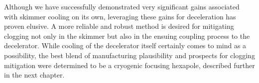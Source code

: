 Although we have successfully demonstrated very significant gains associated with skimmer cooling on its own, leveraging these gains for deceleration has proven elusive.
A more reliable and robust method is desired for mitigating clogging not only in the skimmer but also in the ensuing coupling process to the decelerator.
While cooling of the decelerator itself certainly comes to mind as a possibility, the best blend of manufacturing plausibility and prospects for clogging mitigation were determined to be a cryogenic focusing hexapole, described further in the next chapter.

\ifx\justbeingincluded\undefined

\fi
